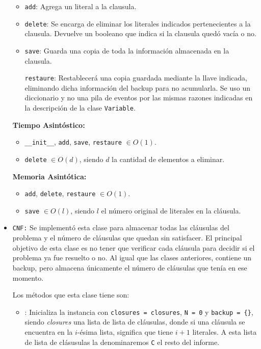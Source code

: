 \documentclass[letterpaper,12pt]{article}
\begin{document}
\begin{itemize}
\begin{itemize}
		\item \texttt{add}: Agrega un literal a la clausula.
		
		\item \texttt{delete}: Se encarga de eliminar los literales indicados pertenecientes a la clausula. Devuelve un booleano que indica si la clausula quedó vacía o no.
	    
	    \item \texttt{save}: Guarda una copia de toda la información almacenada en la clausula.
	    
	    \texttt{restaure}: Restablecerá una copia guardada mediante la llave indicada, eliminando dicha informaci\'on del backup para no acumularla. Se uso un diccionario y no una pila de eventos por las mismas razones indicadas en la descripci\'on de la clase \texttt{Variable}.
	\end{itemize}
	
	\textbf{Tiempo Asintóstico:}
    \begin{itemize}
    	\item \texttt{\_\_init\_\_}, \texttt{add}, \texttt{save}, \texttt{restaure} $\in O(1)$.
    	
    	\item \texttt{delete} $\in O(d)$, siendo $d$ la cantidad de elementos a eliminar.
    \end{itemize} 
    
    \textbf{Memoria Asintótica:}
    \begin{itemize}
    	\item \texttt{add}, \texttt{delete}, \texttt{restaure} $\in O(1)$.
    	\item \texttt{save} $\in O(l)$, siendo $l$ el n\'umero original de literales en la cl\'ausula.
    \end{itemize}
    
    \item \texttt{CNF:} Se implement\'o esta clase para almacenar todas las cl\'ausulas del problema y el n\'umero de cl\'ausulas que quedan sin satisfacer. El principal objetivo de esta clase es no tener que verificar cada cl\'ausula para decidir si el problema ya fue resuelto o no. Al igual que las clases anteriores, contiene un backup, pero almacena \'unicamente el n\'umero de cl\'ausulas que ten\'ia en ese momento.
    
    Los métodos que esta clase tiene son:
	\begin{itemize}	   
		\item {}: Inicializa la instancia con \texttt{closures = closures}, \texttt{N = 0} y \texttt{backup = \{\}}, siendo \textit{closures} una lista de lista de cl\'ausulas, donde si una cl\'ausula se encuentra en la $i$-\'esima lista, significa que tiene $i+1$ literales. A esta lista de lista de cl\'asusulas la denominaremos \texttt{C} el resto del informe.
		 

\end{itemize}
\end{itemize}
\end{document}
